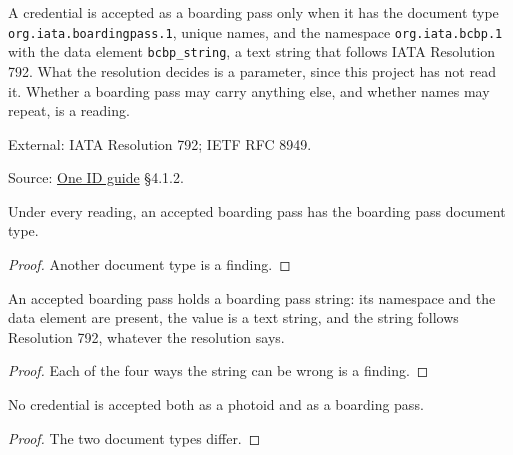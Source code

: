 \begin{definition}
  \label{def:boarding-pass}
  A credential is accepted as a boarding pass only when it has the document
  type \texttt{org.iata.boardingpass.1}, unique names, and the namespace
  \texttt{org.iata.bcbp.1} with the data element \texttt{bcbp\_string}, a text
  string that follows IATA Resolution 792.  What the resolution decides is a
  parameter, since this project has not read it.  Whether a boarding pass may
  carry anything else, and whether names may repeat, is a reading.

  External: IATA Resolution 792; IETF RFC 8949.

  Source: \href{https://standards.atlassian.net/wiki/spaces/OneID/pages/2947416082/Technical+Implementation+Guide}{One ID guide} §4.1.2.
\end{definition}

\begin{theorem}
  \label{thm:bp-doctype}
  Under every reading, an accepted boarding pass has the boarding pass
  document type.
\end{theorem}
\begin{proof}
  Another document type is a finding.
\end{proof}

\begin{theorem}
  \label{thm:bp-has-string}
  An accepted boarding pass holds a boarding pass string: its namespace and
  the data element are present, the value is a text string, and the string
  follows Resolution 792, whatever the resolution says.
\end{theorem}
\begin{proof}
  Each of the four ways the string can be wrong is a finding.
\end{proof}

\begin{theorem}
  \label{thm:not-both}
  No credential is accepted both as a photoid and as a boarding pass.
\end{theorem}
\begin{proof}
  The two document types differ.
\end{proof}

